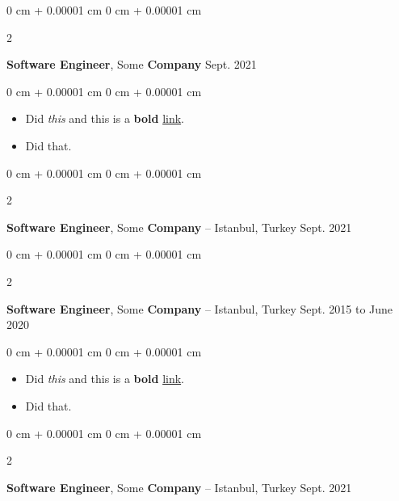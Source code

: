 \documentclass[10pt, letterpaper]{article}
\newenvironment{highlights}{
    \begin{itemize}[
        topsep=0.10 cm,
        parsep=0.10 cm,
        partopsep=0pt,
        itemsep=0pt,
        leftmargin=0 cm + 10pt
    ]
}{
    \end{itemize}
        
    \vspace{-0.10cm}
} %
\newenvironment{onecolentry}{
    \begin{adjustwidth}{
        0 cm + 0.00001 cm
    }{
        0 cm + 0.00001 cm
    }
}{
    \end{adjustwidth}
} %
\newenvironment{twocolentry}[2][]{
    \onecolentry
    \def\secondColumn{#2}
    \setcolumnwidth{\fill, 4.1 cm}
    \begin{paracol}{2}
}{
    \switchcolumn \raggedleft \secondColumn
    \end{paracol}
    \endonecolentry
} %
\begin{document}
        \vspace{0.15 cm}

        \begin{twocolentry}{
            Sept. 2021
        }
            \textbf{Software Engineer}, Some \textbf{Company}\end{twocolentry}

        \vspace{0.10 cm}
        \begin{onecolentry}
            \begin{highlights}
                \item Did \textit{this} and this is a \textbf{bold} \href{https://example.com}{link}.
                \item Did that.
            \end{highlights}
        \end{onecolentry}


        \vspace{0.15 cm}

        \begin{twocolentry}{
            Sept. 2021
        }
            \textbf{Software Engineer}, Some \textbf{Company} -- Istanbul, Turkey\end{twocolentry}

        \vspace{0.10 cm}


        \vspace{0.15 cm}

        \begin{twocolentry}{
            Sept. 2015 to June 2020
        }
            \textbf{Software Engineer}, Some \textbf{Company} -- Istanbul, Turkey\end{twocolentry}

        \vspace{0.10 cm}
        \begin{onecolentry}
            \begin{highlights}
                \item Did \textit{this} and this is a \textbf{bold} \href{https://example.com}{link}.
                \item Did that.
            \end{highlights}
        \end{onecolentry}


        \vspace{0.15 cm}

        \begin{twocolentry}{
            Sept. 2021
        }
            \textbf{Software Engineer}, Some \textbf{Company} -- Istanbul, Turkey\end{twocolentry}
\end{document}
